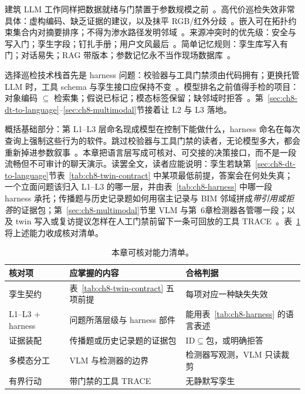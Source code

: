 建筑 LLM 工作同样把数据就绪与门禁置于参数规模之前~\cite{ma2026tenquestions,pan2026graphdtgpt,gao2026ifcagent,luo2025llmdtrobot}。高代价巡检失效非常具体：虚构编码、缺乏证据的建议，以及抹平 RGB/红外分歧~\cite{ji2023}。嵌入可在拓扑约束集合内对摘要排序；不得为渗水路径发明邻域~\cite{peng2024,jeon2025hybridrag}。来源冲突时的优先级：安全与写入门；孪生字段；钉扎手册；用户文风最后~\cite{saka2024gptconstruction}。简单记忆规则：孪生库写入有门；对话易失；RAG 带版本；参数记忆永不当作现场数据库~\cite{luo2025llmdtrobot,rawat2025llmmas}。

选择巡检技术栈首先是 harness 问题：校验器与工具门禁须由代码拥有；更换托管 LLM 时，工具 schema 与孪生接口应保持不变~\cite{saka2024gptconstruction,liang2023helm}。模型排名之前值得手检的项目：对象编码 $\subseteq$ 检索集；假说已标记；模态标签保留；缺邻域时拒答~\cite{ji2023,shuster2021,lewis2020}。第~\ref{sec:ch8-dt-to-language}--\ref{sec:ch8-multimodal}节接着让 L2 与 L3 落地。



概括基础部分：第 L1--L3 层命名现成模型在控制下能做什么，harness 命名在每次查询上强制这些行为的软件。跳过校验器与工具门禁的读者，无论模型多大，都会重新掉进参数叙事~\cite{ji2023,liang2023helm,ma2026tenquestions}。本章把语言层写成可核对、可交接的决策接口，而不是一段流畅但不可审计的聊天演示。读罢全文，读者应能说明：孪生若缺第~\ref{sec:ch8-dt-to-language}节表~\ref{tab:ch8-twin-contract} 中某项最低前提，答案会在何处失真；一个立面问题该归入 L1--L3 的哪一层，并由表~\ref{tab:ch8-harness} 中哪一段 harness 承托；传播题与历史记录题如何用宿主记录与 BIM 邻域拼成\emph{带引用或拒答}的证据包；第~\ref{sec:ch8-multimodal}节里 VLM 与第~6章检测器各管哪一段；以及 twin 写入或复访提议怎样在人工门禁前留下一条可回放的工具 TRACE~\cite{peng2024,yao2023react,liang2023helm,hellin2025bimmas}。表~\ref{tab:ch8-outcomes} 将上述能力收成核对清单。

\begin{table}[htbp]
\centering
\caption{本章可核对能力清单。}
\label{tab:ch8-outcomes}
\begin{tabular}{llp{5.0cm}}
\toprule
核对项 & 应掌握的内容 & 合格判据 \\
\midrule
孪生契约 & 表~\ref{tab:ch8-twin-contract} 五项前提 & 每项对应一种缺失失效 \\
L1--L3 + harness & 问题所落层级与 harness 部件 & 能用表~\ref{tab:ch8-harness} 的语言表述 \\
证据装配 & 传播题或历史记录题的证据包 & ID$\subseteq$包，或明确拒答 \\
多模态分工 & VLM 与检测器的边界 & 检测器写观测，VLM 只读裁剪 \\
有界行动 & 带门禁的工具 TRACE & 无静默写孪生 \\
\bottomrule
\end{tabular}
\end{table}

